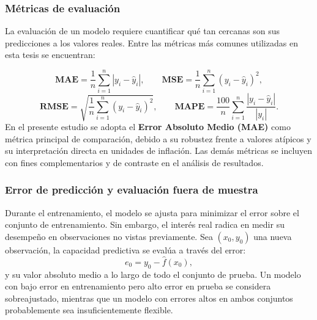 \documentclass[12pt,letterpaper]{article}
\begin{document}
\subsubsection{Métricas de evaluación}
La evaluación de un modelo requiere cuantificar qué tan cercanas son sus predicciones a los valores reales.  
Entre las métricas más comunes utilizadas en esta tesis se encuentran:

\[
\textbf{MAE} = \frac{1}{n} \sum_{i=1}^{n} |y_i - \hat{y}_i|, 
\qquad
\textbf{MSE} = \frac{1}{n} \sum_{i=1}^{n} (y_i - \hat{y}_i)^2,
\]
\[
\textbf{RMSE} = \sqrt{\frac{1}{n} \sum_{i=1}^{n} (y_i - \hat{y}_i)^2},
\qquad
\textbf{MAPE} = \frac{100}{n} \sum_{i=1}^{n} \frac{|y_i - \hat{y}_i|}{|y_i|}.
\]
En el presente estudio se adopta el \textbf{Error Absoluto Medio (MAE)} como métrica principal de comparación, debido a su robustez frente a valores atípicos y su interpretación directa en unidades de inflación.  
Las demás métricas se incluyen con fines complementarios y de contraste en el análisis de resultados.

\subsubsection{Error de predicción y evaluación fuera de muestra}
Durante el entrenamiento, el modelo se ajusta para minimizar el error sobre el conjunto de entrenamiento.  
Sin embargo, el interés real radica en medir su desempeño en observaciones no vistas previamente.  
Sea $(x_0, y_0)$ una nueva observación, la capacidad predictiva se evalúa a través del error:
\[
e_0 = y_0 - \hat{f}(x_0),
\]
y su valor absoluto medio a lo largo de todo el conjunto de prueba.  
Un modelo con bajo error en entrenamiento pero alto error en prueba se considera sobreajustado, mientras que un modelo con errores altos en ambos conjuntos probablemente sea insuficientemente flexible.
\end{document}
